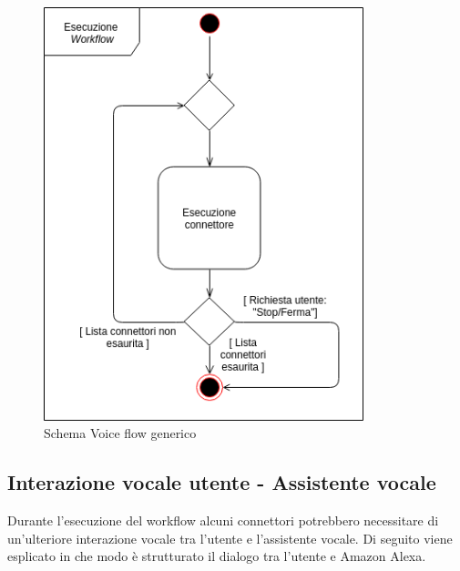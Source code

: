 \begin{figure}[H]
	\centering
	\includegraphics[height=12cm]{../includes/pics/esecuzione_connettore.png}
	\caption{\label{fig:mission}Schema Voice flow generico}
\end{figure}
\subsection{Interazione vocale utente - Assistente vocale}
\label{sec:iterazione_vocale_utente}
Durante l'esecuzione del workflow alcuni connettori potrebbero necessitare di un'ulteriore interazione vocale tra l'utente e l'assistente vocale. Di seguito viene esplicato in che modo è strutturato il dialogo tra l'utente e Amazon Alexa.
